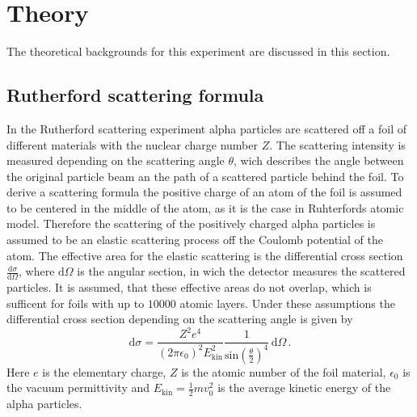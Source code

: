 \section{Theory}
\label{sec:Theorie}
The theoretical backgrounds for this experiment are discussed in this section. 


\subsection{Rutherford scattering formula}
In the Rutherford scattering experiment alpha particles are scattered off a foil of different materials with the nuclear charge number $Z$. 
The scattering intensity is measured depending on the scattering angle $\theta$, wich describes the angle between the original particle beam an the path of a scattered particle behind the foil.
To derive a scattering formula the positive charge of an atom of the foil is assumed to be centered in the middle of the atom, as it is the case in Ruhterfords atomic model. 
Therefore the scattering of the positively charged alpha particles is assumed to be an elastic scattering process off the Coulomb potential of the atom. 
The effective area for the elastic scattering is the differential cross section $\frac{\mathrm{d} \sigma}{\mathrm{d} \Omega }$, 
where $\mathrm{d} \Omega$ is the angular section, in wich the detector measures the scattered particles. 
It is assumed, that these effective areas do not overlap, which is sufficent for foils with up to $\num{10000}$ atomic layers. 
Under these assumptions the differential cross section depending on the scattering angle is given by
\begin{equation}
    \mathrm{d} \sigma = \frac{Z^2 e^4}{\left(2 \pi \epsilon_0\right)^2 E_{\mathrm{kin}}^2 } \frac{1}{\mathrm{sin}\left(\frac{\theta}{2}\right)^4} \, \mathrm{d} \Omega \, .
    \label{eqn:rutherford}
\end{equation}
Here $e$ is the elementary charge, $Z$ is the atomic number of the foil material, $\epsilon_0$ is the vacuum permittivity and $E_{\mathrm{kin}}= \frac{1}{2} m v_0^2$ is the average kinetic energy of the alpha particles.
